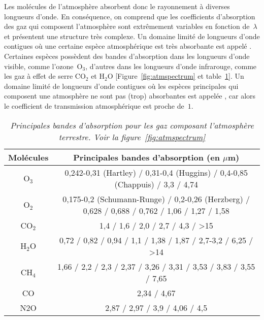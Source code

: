 \sk
Les molécules de l'atmosphère absorbent donc le rayonnement à diverses longueurs d'onde. En conséquence, on comprend que les coefficients d'absorption des gaz qui composent l'atmosphère sont extrêmement variables en fonction de~$\lambda$ et présentent une structure très complexe. Un domaine limité de longueurs d'onde contigues où une certaine espèce atmosphérique est très absorbante est appelé . Certaines espèces possèdent des bandes d'absorption dans les longueurs d'onde visible, comme l'ozone~O$_3$, d'autres dans les longueurs d'onde infrarouge, comme les gaz à effet de serre CO$_2$ et H$_2$O [Figure~\ref{fig:atmspectrum} et table~\ref{tab:abs}]. Un domaine limité de longueurs d'onde contigues où les espèces principales qui composent une atmosphère ne sont pas (trop) absorbantes est appelée , car alors le coefficient de transmission atmosphérique est proche de~$1$.

\small
\begin{table}\label{tab:abs}
\begin{center}
\begin{tabular}{|c|c|}
\hline
Molécules & Principales bandes d'absorption (en $\mu$m) \\
\hline
O$_3$ & 0,242-0,31 (Hartley) / 0,31-0,4 (Huggins) / 0,4-0,85 (Chappuis) / 3,3 / 4,74 \\
O$_2$ & 0,175-0,2 (Schumann-Runge) / 0,2-0,26 (Herzberg) / 0,628 / 0,688 / 0,762 / 1,06 / 1,27 / 1,58 \\
CO$_2$ & 1,4 / 1,6 / 2,0 / 2,7 / 4,3 / >15 \\
H$_2$O & 0,72 / 0,82 / 0,94 / 1,1 / 1,38 / 1,87 / 2,7-3,2 / 6,25 / >14 \\
CH$_4$ & 1,66 / 2,2 / 2,3 / 2,37 / 3,26 / 3,31 / 3,53 / 3,83 / 3,55 / 7,65 \\
CO & 2,34 / 4,67 \\
N2O & 2,87 / 2,97 / 3,9 / 4,06 / 4,5 \\
\hline
\end{tabular}
\caption{\emph{Principales bandes d'absorption pour les gaz composant l'atmosphère terrestre. Voir la figure~\ref{fig:atmspectrum}}}
\end{center}
\end{table}
\normalsize

